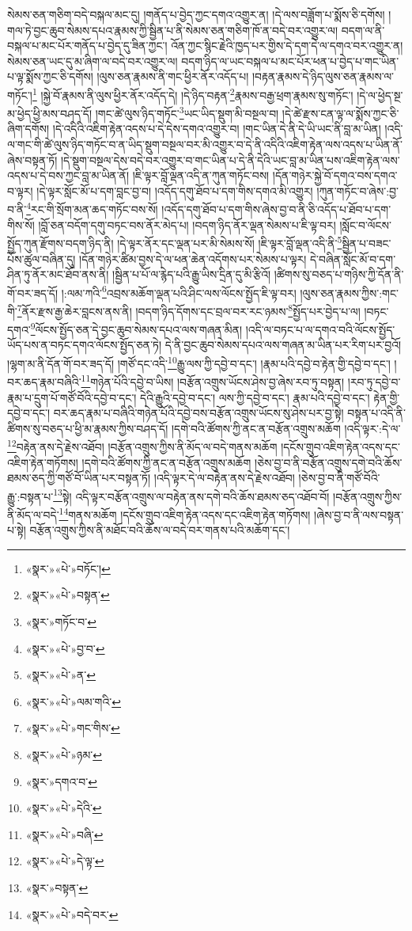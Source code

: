 སེམས་ཅན་གཅིག་བདེ་བསྐལ་མང་དུ། །གནོད་པ་བྱེད་ཀྱང་དགའ་འགྱུར་ན། །དེ་ལས་བཟློག་པ་སྨོས་ཅི་དགོས། །གལ་ཏེ་བྱང་ཆུབ་སེམས་དཔའ་རྣམས་ཀྱི་སྦྱིན་པ་ནི་སེམས་ཅན་གཅིག་ཁོ་ན་བདེ་བར་འགྱུར་ལ། བདག་ལ་ནི་བསྐལ་པ་མང་པོར་གནོད་པ་བྱེད་དུ་ཟིན་ཀྱང་། འོན་ཀྱང་སྙིང་རྗེའི་ཁྱད་པར་གྱིས་དེ་དག་དེ་ལ་དགའ་བར་འགྱུར་ན། སེམས་ཅན་ཡང་དུ་མ་ཞིག་ལ་བདེ་བར་འགྱུར་ལ། བདག་ཉིད་ལ་ཡང་བསྐལ་པ་མང་པོར་ཕན་པ་བྱེད་པ་གང་ཡིན་པ་ལྟ་སྨོས་ཀྱང་ཅི་དགོས། །ལུས་ཅན་རྣམས་ནི་གང་ཕྱིར་ནོར་འདོད་པ། །བརྟན་རྣམས་དེ་ཉིད་ལུས་ཅན་རྣམས་ལ་གཏོང་།\footnote{«སྣར་»«པེ་»བཏོང་།} །སྐྱེ་བོ་རྣམས་ནི་ལུས་ཕྱིར་ནོར་འདོད་དེ། །དེ་ཉིད་བརྟན་\footnote{«སྣར་»«པེ་»བསྟན་}རྣམས་བརྒྱ་ཕྲག་རྣམས་སུ་གཏོང་། །དེ་ལ་ཕྱེད་སྔ་མ་ཕྱེད་ཕྱི་མས་བཤད་དོ། །གང་ཚེ་ལུས་ཉིད་གཏོང་\footnote{«སྣར་»གཏོང་བ་}ཡང་ཡིད་སྡུག་མི་བསྔལ་བ། །དེ་ཚེ་རྫས་ངན་ལྟ་ལ་སྨོས་ཀྱང་ཅི་ཞིག་དགོས། །དེ་འདིའི་འཇིག་རྟེན་འདས་པ་དེ་དེས་དགའ་འགྱུར་བ། །གང་ཡིན་དེ་ནི་དེ་ཡི་ཡང་ནི་བླ་མ་ཡིན། །འདི་ལ་གང་གི་ཚེ་ལུས་ཉིད་གཏོང་བ་ན་ཡིད་སྡུག་བསྔལ་བར་མི་འགྱུར་བ་དེ་ནི་འདིའི་འཇིག་རྟེན་ལས་འདས་པ་ཡིན་ནོ་ཞེས་བསྟན་ཏོ། །དེ་སྡུག་བསྔལ་དེས་བདེ་བར་འགྱུར་བ་གང་ཡིན་པ་དེ་ནི་དེའི་ཡང་བླ་མ་ཡིན་པས་འཇིག་རྟེན་ལས་འདས་པ་དེ་བས་ཀྱང་བླ་མ་ཡིན་ནོ། །ཇི་ལྟར་བློ་ལྡན་འདི་ན་ཀུན་གཏོང་བས། །དོན་གཉེར་སྐྱེ་བོ་དགའ་བས་དགའ་བ་ལྟར། །དེ་ལྟར་སློང་མོ་པ་དག་བླང་བྱ་བ། །འདོད་དགུ་ཐོབ་པ་དག་གིས་དགའ་མི་འགྱུར། །ཀུན་གཏོང་བ་ཞེས་:བྱ་བ་ནི་\footnote{«སྣར་»«པེ་»བྱ་བ་}རང་གི་སྲོག་མན་ཆད་གཏོང་བས་སོ། །འདོད་དགུ་ཐོབ་པ་དག་གིས་ཞེས་བྱ་བ་ནི་ཅི་འདོད་པ་ཐོབ་པ་དག་གིས་སོ། །བློ་ཅན་བདོག་དགུ་བཏང་བས་ནོར་མེད་པ། །བདག་ཉིད་ནོར་ལྡན་སེམས་པ་ཇི་ལྟ་བར། །སློང་བ་ལོངས་སྤྱོད་ཀུན་རྫོགས་བདག་ཉིད་ནི། །དེ་ལྟར་ནོར་དང་ལྡན་པར་མི་སེམས་སོ། །ཇི་ལྟར་བློ་ལྡན་འདི་ནི་\footnote{«སྣར་»«པེ་»ན་}སྦྱིན་པ་བཟང་པོས་ཚུལ་བཞིན་དུ། །དོན་གཉེར་ཚིམ་བྱས་དེ་ལ་ཕན་ཆེན་འདོགས་པར་སེམས་པ་ལྟར། དེ་བཞིན་སློང་མོ་བ་དག་ཤིན་ཏུ་ནོར་མང་ཐོབ་ནས་ནི། །སྦྱིན་པ་པོ་ལ་རྙེད་པའི་རྒྱུ་ཡིས་དྲིན་དུ་མི་རྩིའོ། །ཚིགས་སུ་བཅད་པ་གཉིས་ཀྱི་དོན་ནི་གོ་བར་ཟད་དོ། །:ལམ་ཀའི་\footnote{«སྣར་»«པེ་»ལམ་གའི་}འབྲས་མཆོག་ལྡན་པའི་ཤིང་ལས་ལོངས་སྤྱོད་ཇི་ལྟ་བར། །ལུས་ཅན་རྣམས་ཀྱིས་:གང་གི་\footnote{«སྣར་»«པེ་»གང་གིས་}ནོར་རྫས་རྒྱ་ཆེར་བླངས་ནས་ནི། །བདག་ཉིད་དོགས་དང་བྲལ་བར་རང་ཉམས་\footnote{«སྣར་»«པེ་»ཉམ་}སྤྱོད་པར་བྱེད་པ་ལ། །བཏང་དགའ་\footnote{«སྣར་»དགའ་བ་}ལོངས་སྤྱོད་ཅན་དེ་བྱང་ཆུབ་སེམས་དཔའ་ལས་གཞན་མིན། །འདི་ལ་བཏང་པ་ལ་དགའ་བའི་ལོངས་སྤྱོད་ཡོད་པས་ན་བཏང་དགའ་ལོངས་སྤྱོད་ཅན་ཏེ། དེ་ནི་བྱང་ཆུབ་སེམས་དཔའ་ལས་གཞན་མ་ཡིན་པར་རིག་པར་བྱའོ། །ལྷག་མ་ནི་དོན་གོ་བར་ཟད་དོ། །གཙོ་དང་འདི་\footnote{«སྣར་»«པེ་»དེའི་}རྒྱུ་ལས་ཀྱི་དབྱེ་བ་དང་། །རྣམ་པའི་དབྱེ་བ་རྟེན་གྱི་དབྱེ་བ་དང་། །བར་ཆད་རྣམ་བཞིའི་\footnote{«སྣར་»«པེ་»བཞི་}གཉེན་པོའི་དབྱེ་བ་ཡིས། །བརྩོན་འགྲུས་ཡོངས་ཤེས་བྱ་ཞེས་རབ་ཏུ་བསྟན། །རབ་ཏུ་དབྱེ་བ་རྣམ་པ་དྲུག་པོ་གཙོ་བོའི་དབྱེ་བ་དང་། དེའི་རྒྱུའི་དབྱེ་བ་དང་། ལས་ཀྱི་དབྱེ་བ་དང་། རྣམ་པའི་དབྱེ་བ་དང་། རྟེན་གྱི་དབྱེ་བ་དང་། བར་ཆད་རྣམ་པ་བཞིའི་གཉེན་པོའི་དབྱེ་བས་བརྩོན་འགྲུས་ཡོངས་སུ་ཤེས་པར་བྱ་སྟེ། བསྟན་པ་འདི་ནི་ཚིགས་སུ་བཅད་པ་ཕྱི་མ་རྣམས་ཀྱིས་བཤད་དོ། །དགེ་བའི་ཚོགས་ཀྱི་ནང་ན་བརྩོན་འགྲུས་མཆོག །འདི་ལྟར་:དེ་ལ་\footnote{«སྣར་»«པེ་»དེ་ལྟ་}བརྟེན་ནས་དེ་རྗེས་འཐོབ། །བརྩོན་འགྲུས་ཀྱིས་ནི་མོད་ལ་བདེ་གནས་མཆོག །དངོས་གྲུབ་འཇིག་རྟེན་འདས་དང་འཇིག་རྟེན་གཏོགས། །དགེ་བའི་ཚོགས་ཀྱི་ནང་ན་བརྩོན་འགྲུས་མཆོག །ཅེས་བྱ་བ་ནི་བརྩོན་འགྲུས་དགེ་བའི་ཆོས་ཐམས་ཅད་ཀྱི་གཙོ་བོ་ཡིན་པར་བསྟན་ཏོ། །འདི་ལྟར་དེ་ལ་བརྟེན་ནས་དེ་རྗེས་འཐོབ། །ཅེས་བྱ་བ་ནི་གཙོ་བོའི་རྒྱུ་:བསྟན་པ་\footnote{«སྣར་»བསྟན་}སྟེ། འདི་ལྟར་བརྩོན་འགྲུས་ལ་བརྟེན་ནས་དགེ་བའི་ཆོས་ཐམས་ཅད་འཐོབ་བོ། །བརྩོན་འགྲུས་ཀྱིས་ནི་མོད་ལ་བདེ་\footnote{«སྣར་»«པེ་»བདེ་བར་}གནས་མཆོག །དངོས་གྲུབ་འཇིག་རྟེན་འདས་དང་འཇིག་རྟེན་གཏོགས། །ཞེས་བྱ་བ་ནི་ལས་བསྟན་པ་སྟེ། བརྩོན་འགྲུས་ཀྱིས་ནི་མཐོང་བའི་ཆོས་ལ་བདེ་བར་གནས་པའི་མཆོག་དང་། 